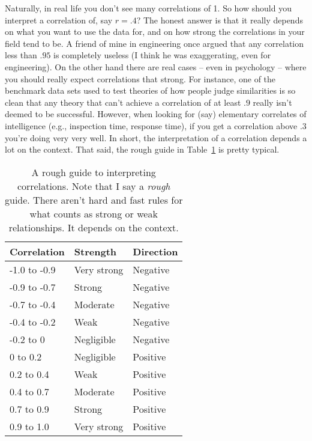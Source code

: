 Naturally, in real life you don't see many correlations of 1. So how should you interpret a correlation of, say $r= .4$? The honest answer is that it really depends on what you want to use the data for, and on how strong the correlations in your field tend to be. A  friend of mine in engineering once argued that any correlation less than $.95$ is completely useless (I think he was exaggerating, even for engineering). On the other hand there are real cases -- even in psychology -- where you should really expect correlations that strong. For instance, one of the benchmark data sets used to test theories of how people judge similarities is so clean that any theory that can't achieve a correlation of at least $.9$ really isn't deemed to be successful. However, when looking for (say) elementary correlates of intelligence (e.g., inspection time, response time), if you get a correlation above $.3$ you're doing very very well. In short, the interpretation of a correlation depends a lot on the context. That said, the rough guide in Table~\ref{tab:interpretingcorrelations} is pretty typical.

\begin{table}[t]
\begin{center}
\caption{A rough guide to interpreting correlations. Note that I say a {\it rough} guide. There aren't hard and fast rules for what counts as strong or weak relationships. It depends on the context.} \tabcapsep
\label{tab:interpretingcorrelations}
\begin{tabular}{l|ll}
Correlation & Strength & Direction \\ \hline
-1.0 to -0.9 & Very strong & Negative \\
-0.9 to -0.7 & Strong & Negative \\
-0.7 to -0.4 & Moderate & Negative \\
-0.4 to -0.2 & Weak & Negative \\
-0.2 to 0 & Negligible & Negative \\ \hline
0 to 0.2 & Negligible & Positive \\
0.2 to 0.4 & Weak & Positive \\
0.4 to 0.7 & Moderate & Positive \\
0.7 to 0.9 & Strong & Positive \\
0.9 to 1.0 & Very strong & Positive \\
\end{tabular}
\tabcapsep \HR
\end{center}
\end{table}

